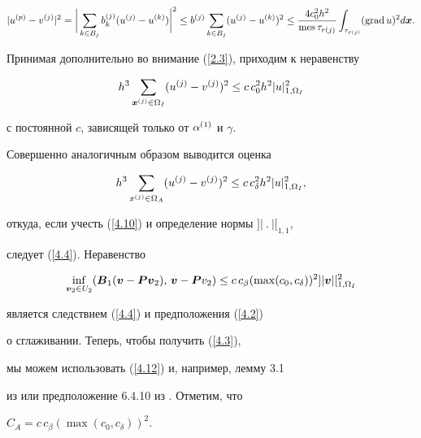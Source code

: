 \begin{pf}
\begin{equation}
|u\up p-v\up j|^2=\bigg|\sum_{k\in B_j}b_k\up j(u\up j-u\up


k)\bigg|^2\le b\up j\sum_{k\in B_j}(u\up j-u\up k)^2\le\frac{4c^2_0


h^2}{\mes\tau_{r(j)}}\int_{\tau_{r(j)}}(\grad u)^2d{\bi x}.


\end{equation}


Принимая дополнительно во внимание (\ref{2.3}), приходим к неравенству


\begin{equation}\label{4.10}


h^3\sum_{{\bi x}\up j\in\Omega_I}(u\up j-v\up j)^2\le c\, c^2_0


h^2|u|^{2}_{{1,\Omega_I}}


\end{equation}


с постоянной $c$, зависящей только от $\alpha^{(1)}$ и $\gamma$.





Совершенно аналогичным образом выводится оценка


\begin{equation}\label{4.11}


h^3\sum_{x\up j\in\Omega_A}(u\up j-v\up j)^2\le c\, c^2_\delta


h^2|u|^{2}_{{1,\Omega_I}},


\end{equation}


откуда, если учесть (\ref{4.10}) и определение нормы $]|\ .\ |[_{{1,1}}$,


следует (\ref{4.4}). Неравенство


\begin{equation}\label{4.12}


\inf\limits_{{\bi v}_2\in U_2}({\bi B}_1({\bi v}-{\bi P}


{\bi v}_2),\,{\bi v}-{\bi P}v_2)\le c\, c_\beta(\max(c_0, c_\delta))^2]|


{\bi v}|[^{2}_{{1,\Omega_I}}


\end{equation}


является следствием (\ref{4.4}) и предположения (\ref{4.2})


о сглаживании. Теперь, чтобы получить (\ref{4.3}),


мы можем использовать (\ref{4.12}) и, например, лемму 3.1


из \cite{[4]} или предположение 6.4.10 из \cite{[17]}. Отметим, что


$C_A=c\,c_\beta(\max(c_0,c_\delta))^2$.


\end{pf}






